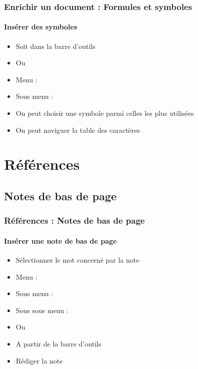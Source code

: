 \documentclass[xcolor=table]{beamer}
\begin{document}
\begin{frame}
\frametitle{Enrichir un document : Formules et symboles}
\framesubtitle{Insérer des symboles}

\begin{minipage}{0.50\textwidth}
	\begin{itemize}
		\item Soit dans la barre d'outils
		\item Ou
		\item Menu : 
		\item Sous menu : 
		\item On peut choisir une symbole parmi celles les plus utilisées
		\item On peut naviguer la table des caractères
	\end{itemize}
\end{minipage}
\begin{minipage}{0.49\textwidth}
	
\end{minipage}

\end{frame}

\section{Références}

%

\subsection{Notes de bas de page}

\begin{frame}[t]
\frametitle{Références : Notes de bas de page}
\framesubtitle{Insérer une note de bas de page}

\begin{minipage}{0.89\textwidth}
	\begin{itemize}
		\item Sélectionner le mot concerné par la note
		\item Menu : 
		\item Sous menu : 
		\item Sous sous menu : 
		\item Ou
		\item A partir de la barre d'outils
		\item Rédiger la note
	\end{itemize}
\end{minipage}
\begin{minipage}{0.10\textwidth}
\end{minipage}

\end{frame}
\end{document}
